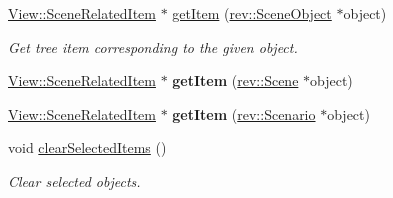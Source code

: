 \begin{Indent}
\begin{DoxyCompactItemize}
\mbox{\hyperlink{classrev_1_1_view_1_1_scene_related_item}{View\+::\+Scene\+Related\+Item}} $\ast$ \mbox{\hyperlink{classrev_1_1_view_1_1_scene_tree_widget_aebc54daf5ba8d29af13186d02272ad18}{get\+Item}} (\mbox{\hyperlink{classrev_1_1_scene_object}{rev\+::\+Scene\+Object}} $\ast$object)
\begin{DoxyCompactList}\small\item\em Get tree item corresponding to the given object. \end{DoxyCompactList}\item 
\mbox{\label{classrev_1_1_view_1_1_scene_tree_widget_a0727d97cca7a07f9cce81be92defdb05}} 
\mbox{\hyperlink{classrev_1_1_view_1_1_scene_related_item}{View\+::\+Scene\+Related\+Item}} $\ast$ {\bfseries get\+Item} (\mbox{\hyperlink{classrev_1_1_scene}{rev\+::\+Scene}} $\ast$object)
\item 
\mbox{\label{classrev_1_1_view_1_1_scene_tree_widget_a040be9171b9e6183e5a3d180d1b7e37a}} 
\mbox{\hyperlink{classrev_1_1_view_1_1_scene_related_item}{View\+::\+Scene\+Related\+Item}} $\ast$ {\bfseries get\+Item} (\mbox{\hyperlink{classrev_1_1_scenario}{rev\+::\+Scenario}} $\ast$object)
\item 
\mbox{\label{classrev_1_1_view_1_1_scene_tree_widget_a34848060dd8b518f855e1ed339c14beb}} 
void \mbox{\hyperlink{classrev_1_1_view_1_1_scene_tree_widget_a34848060dd8b518f855e1ed339c14beb}{clear\+Selected\+Items}} ()
\begin{DoxyCompactList}\small\item\em Clear selected objects. \end{DoxyCompactList}\end{DoxyCompactItemize}
\end{Indent}
